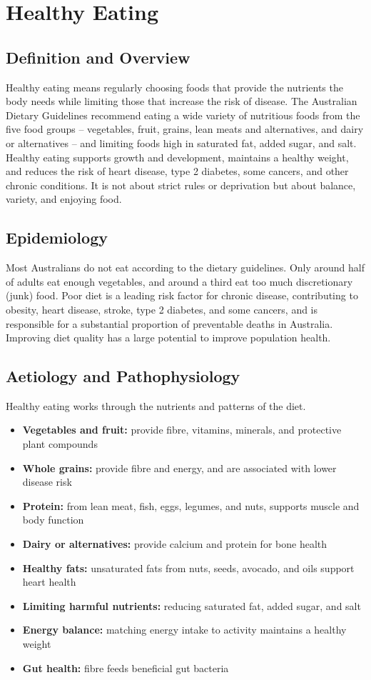\chapter{Healthy Eating}

\section*{Definition and Overview}
Healthy eating means regularly choosing foods that provide the nutrients the body needs while limiting those that increase the risk of disease. The Australian Dietary Guidelines recommend eating a wide variety of nutritious foods from the five food groups -- vegetables, fruit, grains, lean meats and alternatives, and dairy or alternatives -- and limiting foods high in saturated fat, added sugar, and salt. Healthy eating supports growth and development, maintains a healthy weight, and reduces the risk of heart disease, type 2 diabetes, some cancers, and other chronic conditions. It is not about strict rules or deprivation but about balance, variety, and enjoying food.

\section*{Epidemiology}
Most Australians do not eat according to the dietary guidelines. Only around half of adults eat enough vegetables, and around a third eat too much discretionary (junk) food. Poor diet is a leading risk factor for chronic disease, contributing to obesity, heart disease, stroke, type 2 diabetes, and some cancers, and is responsible for a substantial proportion of preventable deaths in Australia. Improving diet quality has a large potential to improve population health.

\section*{Aetiology and Pathophysiology}
Healthy eating works through the nutrients and patterns of the diet.

\begin{itemize}
    \item \textbf{Vegetables and fruit:} provide fibre, vitamins, minerals, and protective plant compounds
    \item \textbf{Whole grains:} provide fibre and energy, and are associated with lower disease risk
    \item \textbf{Protein:} from lean meat, fish, eggs, legumes, and nuts, supports muscle and body function
    \item \textbf{Dairy or alternatives:} provide calcium and protein for bone health
    \item \textbf{Healthy fats:} unsaturated fats from nuts, seeds, avocado, and oils support heart health
    \item \textbf{Limiting harmful nutrients:} reducing saturated fat, added sugar, and salt
    \item \textbf{Energy balance:} matching energy intake to activity maintains a healthy weight
    \item \textbf{Gut health:} fibre feeds beneficial gut bacteria
\end{itemize}


